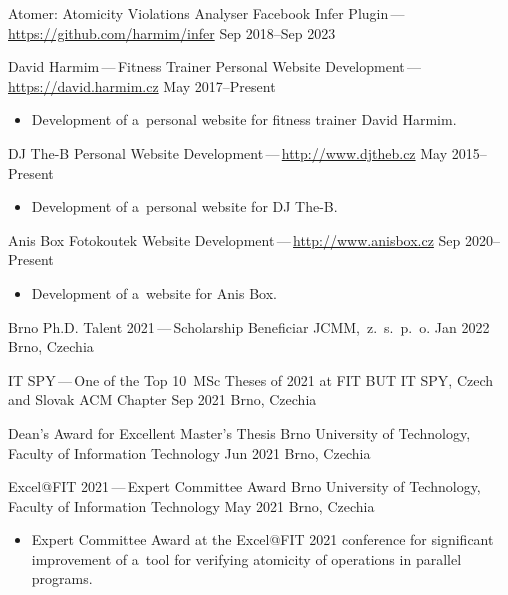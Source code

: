 \documentclass[10pt, a4paper, academicons]{altacv}
\newcommand{\hrefd}[1]{\href{#1}{#1}}
\begin{document}


\cvevent
{Atomer: Atomicity Violations Analyser}
{Facebook Infer Plugin\,---\,\hrefd{https://github.com/harmim/infer}}
{Sep 2018--Sep 2023}
{}
\medskip

\cvevent
{David Harmim\,---\,Fitness Trainer}
{Personal Website Development\,---\,\hrefd{https://david.harmim.cz}}
{May 2017--Present}
{}
\begin{itemize}\setlength{\itemindent}{.5em}\small
    \item[--] Development of a~personal website for fitness trainer David Harmim.
\end{itemize}
\medskip

\cvevent
{DJ The-B}
{Personal Website Development\,---\,\hrefd{http://www.djtheb.cz}}
{May 2015--Present}
{}
\begin{itemize}\setlength{\itemindent}{.5em}\small
    \item[--] Development of a~personal website for DJ The-B.
\end{itemize}
\medskip

\cvevent
{Anis Box Fotokoutek}
{Website Development\,---\,\hrefd{http://www.anisbox.cz}}
{Sep 2020--Present}
{}
\begin{itemize}\setlength{\itemindent}{.5em}\small
    \item[--] Development of a~website for Anis Box.
\end{itemize}



\cvevent
{Brno Ph.D. Talent 2021\,---\,Scholarship Beneficiar}
{JCMM,~z.~s.~p.~o.}
{Jan 2022}
{Brno, Czechia}

\cvevent
{IT SPY\,---\,One of the Top 10~MSc Theses of 2021 at FIT BUT}
{IT SPY, Czech and Slovak ACM Chapter}
{Sep 2021}
{Brno, Czechia}

\cvevent
{Dean's Award for Excellent Master's Thesis}
{Brno University of Technology, Faculty of Information Technology}
{Jun 2021}
{Brno, Czechia}

\cvevent
{Excel@FIT 2021\,---\,Expert Committee Award}
{Brno University of Technology, Faculty of Information Technology}
{May 2021}
{Brno, Czechia}
\begin{itemize}\setlength{\itemindent}{.5em}\small
    \item[--] Expert Committee Award at the Excel@FIT 2021 conference for significant improvement of a~tool for verifying atomicity of operations in parallel programs.
\end{itemize}
\medskip
\end{document}
